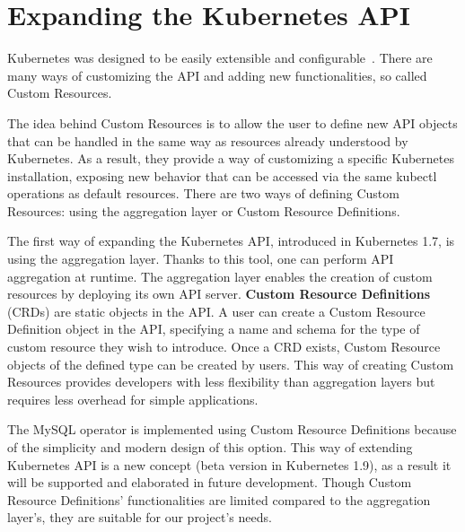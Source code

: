 \section{Expanding the Kubernetes API}
Kubernetes was designed to be easily extensible and configurable~\cite{extending-kubeapi}. There are
many ways of customizing the API and adding new functionalities, so called Custom Resources.

The idea behind Custom Resources is to allow the user to define new API objects that can be handled
in the same way as resources already understood by Kubernetes. As a result, they provide a way of
customizing a specific Kubernetes installation, exposing new behavior that can be accessed via the
same kubectl operations as default resources. There are two ways of defining Custom Resources: using
the aggregation layer or Custom Resource Definitions.

The first way of expanding the Kubernetes API, introduced in Kubernetes 1.7, is using the
aggregation layer. Thanks to this tool, one can perform API aggregation at runtime. The aggregation
layer enables the creation of custom resources by deploying its own API server.
\textbf{Custom Resource Definitions} (CRDs) are static objects in the API. A user can create a
Custom Resource Definition object in the API, specifying a name and schema for the type of custom
resource they wish to introduce. Once a CRD exists, Custom Resource objects of the defined type can
be created by users. This way of creating Custom Resources provides developers with less flexibility
than aggregation layers but requires less overhead for simple applications.

The MySQL operator is implemented using Custom Resource Definitions because of the simplicity and
modern design of this option. This way of extending Kubernetes API is a new concept (beta version in
Kubernetes 1.9), as a result it will be supported and elaborated in future development. Though
Custom Resource Definitions’ functionalities are limited compared to the aggregation layer’s, they
are suitable for our project’s needs.